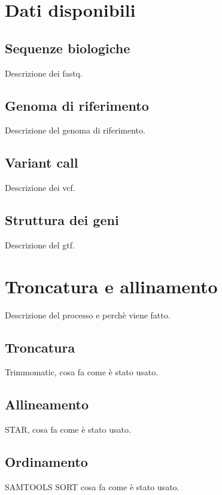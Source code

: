   \section{Dati disponibili}
  \label{sec:dati}

    \subsection{Sequenze biologiche}
    \label{subsec:fastq}
    Descrizione dei fastq.

    \subsection{Genoma di riferimento}
    \label{subsec:star-gen}
    Descrizione del genoma di riferimento.

    \subsection{Variant call}
    \label{subsec:vcf}
    Descrizione dei vcf.

    \subsection{Struttura dei geni}
    \label{subsec:gtf}
    Descrizione del gtf.

  \section{Troncatura e allinamento}
  \label{sec:trimm_star}
  Descrizione del processo e perch\`e viene fatto.

    \subsection{Troncatura}
    \label{subsec:trimm}
    Trimmomatic, cosa fa come \`e stato usato.

    \subsection{Allineamento}
    \label{subsect:star}
    STAR, cosa fa come \`e stato usato.

    \subsection{Ordinamento}
    \label{subsec:sorting}
    SAMTOOLS SORT cosa fa come \`e stato usato.

